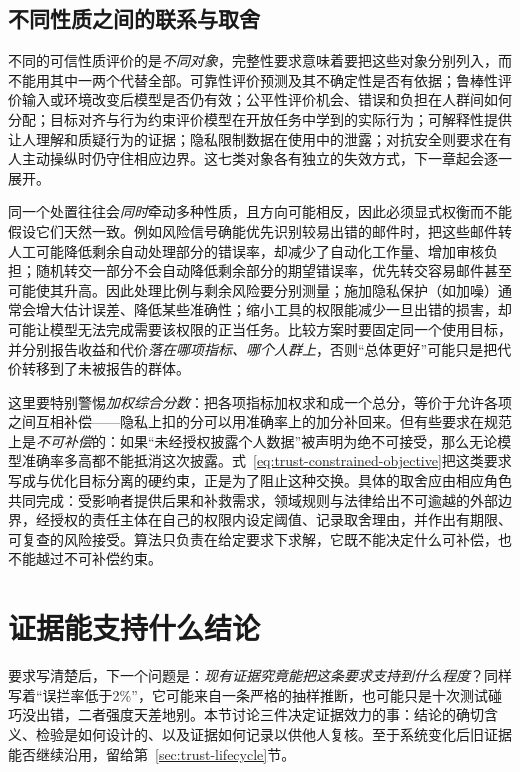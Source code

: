 \subsection{不同性质之间的联系与取舍}

不同的可信性质评价的是\emph{不同对象}，完整性要求意味着要把这些对象分别列入，而不能用其中一两个代替全部。可靠性评价预测及其不确定性是否有依据；鲁棒性评价输入或环境改变后模型是否仍有效；公平性评价机会、错误和负担在人群间如何分配；目标对齐与行为约束评价模型在开放任务中学到的实际行为；可解释性提供让人理解和质疑行为的证据；隐私限制数据在使用中的泄露；对抗安全则要求在有人主动操纵时仍守住相应边界。这七类对象各有独立的失效方式，下一章起会逐一展开。

同一个处置往往会\emph{同时}牵动多种性质，且方向可能相反，因此必须显式权衡而不能假设它们天然一致。例如风险信号确能优先识别较易出错的邮件时，把这些邮件转人工可能降低剩余自动处理部分的错误率，却减少了自动化工作量、增加审核负担；随机转交一部分不会自动降低剩余部分的期望错误率，优先转交容易邮件甚至可能使其升高。因此处理比例与剩余风险要分别测量；施加隐私保护（如加噪）通常会增大估计误差、降低某些准确性；缩小工具的权限能减少一旦出错的损害，却可能让模型无法完成需要该权限的正当任务。比较方案时要固定同一个使用目标，并分别报告收益和代价\emph{落在哪项指标、哪个人群上}，否则“总体更好”可能只是把代价转移到了未被报告的群体。

这里要特别警惕\emph{加权综合分数}：把各项指标加权求和成一个总分，等价于允许各项之间互相补偿——隐私上扣的分可以用准确率上的加分补回来。但有些要求在规范上是\emph{不可补偿}的：如果“未经授权披露个人数据”被声明为绝不可接受，那么无论模型准确率多高都不能抵消这次披露。式~\eqref{eq:trust-constrained-objective}把这类要求写成与优化目标分离的硬约束，正是为了阻止这种交换。具体的取舍应由相应角色共同完成：受影响者提供后果和补救需求，领域规则与法律给出不可逾越的外部边界，经授权的责任主体在自己的权限内设定阈值、记录取舍理由，并作出有期限、可复查的风险接受。算法只负责在给定要求下求解，它既不能决定什么可补偿，也不能越过不可补偿约束。

\section{证据能支持什么结论}
\label{sec:trust-evidence}

要求写清楚后，下一个问题是：\emph{现有证据究竟能把这条要求支持到什么程度}？同样写着“误拦率低于2\%”，它可能来自一条严格的抽样推断，也可能只是十次测试碰巧没出错，二者强度天差地别。本节讨论三件决定证据效力的事：结论的确切含义、检验是如何设计的、以及证据如何记录以供他人复核。至于系统变化后旧证据能否继续沿用，留给第~\ref{sec:trust-lifecycle}节。

